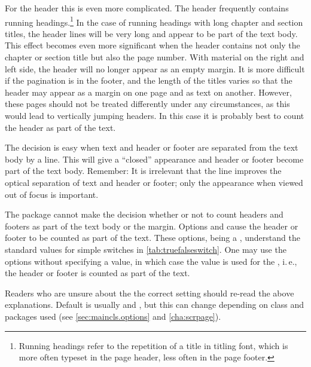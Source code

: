 \begin{Explain}
  For the header this is even more complicated. The header frequently
  contains running headings.\footnote{Running headings refer to the repetition of a
    title in titling font, which is more often typeset in the page
    header, less often in the page footer.}  In the case of running
  headings with long chapter and section titles, the header lines will
  be very long and appear to be part of the text body.  This effect
  becomes even more significant when the header contains not only the
  chapter or section title but also the page number. With material on
  the right and left side, the header will no longer appear as an
  empty margin. It is more difficult if the pagination is in the
  footer, and the length of the titles varies so that the header may
  appear as a margin on one page and as text on another.  However,
  these pages should not be treated differently under any
  circumstances, as this would lead to vertically jumping headers. In
  this case it is probably best to count the header as part of the
  text.

  The decision is easy when text and header or footer are separated
  from the text body by a line. This will give a ``closed'' appearance
  and header or footer become part of the text body.  Remember: It is
  irrelevant that the line improves the optical separation of text and
  header or footer; only the appearance when viewed out
  of focus is important.
\end{Explain}

The  package cannot make the decision whether or
not to count headers and footers as part of the text body or the
margin. Options  and  cause
the header or footer to be counted as part of the text.  These
options, being a ,
understand the standard values for simple switches in
\autoref{tab:truefalseswitch}. One may use the options without
specifying a value, in which case the value  is used for
the , i.\,e., the header or footer is counted as part of
the text.

Readers who are unsure about the the correct setting should re-read
the above explanations. Default is usually
 and ,
but this can change depending on {\KOMAScript} class and {\KOMAScript}
packages used (see \autoref{sec:maincls.options} and
\autoref{cha:scrpage}).


